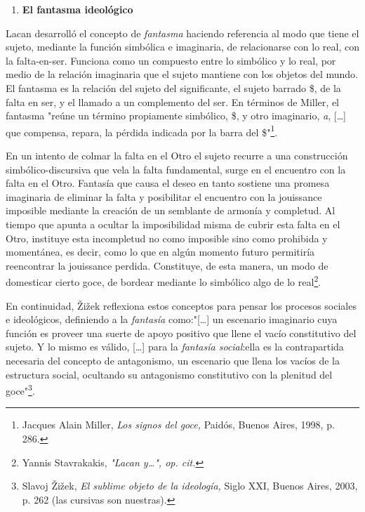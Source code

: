 \documentclass{book}
\begin{document}
\begin{enumerate}
\def\labelenumi{\arabic{enumi}.}
\setcounter{enumi}{3}
\item
  \textbf{El fantasma ideológico}
\end{enumerate}

Lacan desarrolló el concepto de \emph{fantasma} haciendo referencia al
modo que tiene el sujeto, mediante la función simbólica e imaginaria, de
relacionarse con lo real, con la falta-en-ser. Funciona como un
compuesto entre lo simbólico y lo real, por medio de la relación
imaginaria que el sujeto mantiene con los objetos del mundo. El fantasma
es la relación del sujeto del significante, el sujeto barrado \$, de la
falta en ser, y el llamado a un complemento del ser. En términos de
Miller, el fantasma "reúne un término propiamente simbólico, \$, y otro
imaginario, \emph{a}, {[}\ldots{]} que compensa, repara, la pérdida
indicada por la barra del \$"\footnote{Jacques Alain Miller, \emph{Los
  signos del goce,} Paidós, Buenos Aires, 1998, p. 286.}.

En un intento de colmar la falta en el Otro el sujeto recurre a una
construcción simbólico-discursiva que vela la falta fundamental, surge
en el encuentro con la falta en el Otro. Fantasía que causa el deseo en
tanto sostiene una promesa imaginaria de eliminar la falta y posibilitar
el encuentro con la jouissance imposible mediante la creación de un
semblante de armonía y completud. Al tiempo que apunta a ocultar la
imposibilidad misma de cubrir esta falta en el Otro, instituye esta
incompletud no como imposible sino como prohibida y momentánea, es
decir, como lo que en algún momento futuro permitiría reencontrar la
jouissance perdida. Constituye, de esta manera, un modo de domesticar
cierto goce, de bordear mediante lo simbólico algo de lo
real\footnote{Yannis Stavrakakis, \emph{"Lacan y\ldots", op. cit.}}.

En continuidad, Žižek reflexiona estos conceptos para pensar los
procesos sociales e ideológicos, definiendo a la \emph{fantasía}
como:"{[}\ldots{]} un escenario imaginario cuya función es proveer una
suerte de apoyo positivo que llene el vacío constitutivo del sujeto. Y
lo mismo es válido, {[}\ldots{]} para la \emph{fantasía social}:ella es
la contrapartida necesaria del concepto de antagonismo, un escenario que
llena los vacíos de la estructura social, ocultando su antagonismo
constitutivo con la plenitud del goce"\footnote{Slavoj Žižek, \emph{El
  sublime objeto de la ideología,} Siglo XXI, Buenos Aires, 2003, p. 262
  (las cursivas son nuestras).}.
\end{document}
